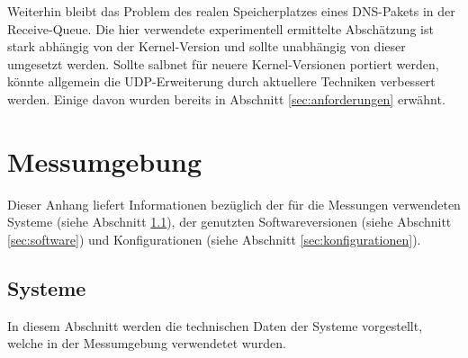 \documentclass[a4paper, 12pt, BCOR10mm, DIV12, toc=bibliography, toc=listof, german]{scrbook}
\begin{document}
		Weiterhin bleibt das Problem des realen Speicherplatzes eines DNS-Pakets in der Receive-Queue.
		Die hier verwendete experimentell ermittelte Abschätzung ist stark abhängig von der
		Kernel-Version und sollte unabhängig von dieser umgesetzt werden. Sollte salbnet für neuere
		Kernel-Versionen portiert werden, könnte allgemein die UDP-Erweiterung durch aktuellere Techniken
		verbessert werden. Einige davon wurden bereits in Abschnitt \ref{sec:anforderungen} erwähnt.




	\appendix

	\chapter{Messumgebung} %
	\label{cha:messumgebung}

	Dieser Anhang liefert Informationen bezüglich der für die Messungen verwendeten Systeme (siehe
	Abschnitt \ref{sec:Systeme}),
	der genutzten Softwareversionen (siehe Abschnitt \ref{sec:software}) und Konfigurationen
	(siehe Abschnitt \ref{sec:konfigurationen}).

		\section{Systeme} %
		\label{sec:Systeme}

			In diesem Abschnitt werden die technischen Daten der Systeme vorgestellt, welche in der
			Messumgebung verwendetet wurden.
\end{document}
